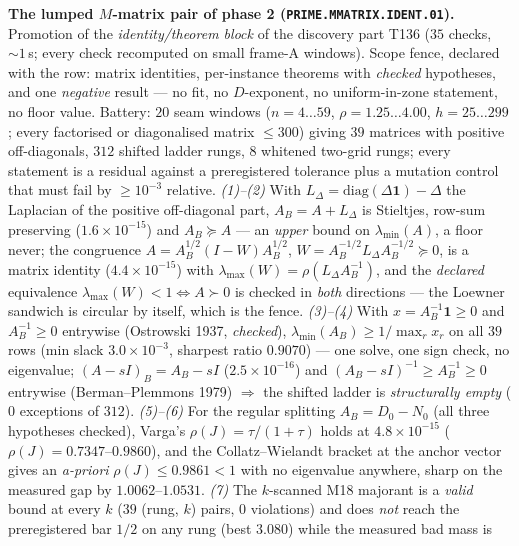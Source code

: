 \par\smallskip\noindent\textbf{The lumped $M$-matrix pair of phase 2
(\texttt{PRIME.MMATRIX.IDENT.01}).}
Promotion of the \emph{identity/theorem block} of the discovery part T136
($35$ checks, ${\sim}1$\,s; every check recomputed on small frame-A windows).
Scope fence, declared with the row: matrix identities, per-instance theorems with
\emph{checked} hypotheses, and one \emph{negative} result --- no fit, no
$D$-exponent, no uniform-in-zone statement, no floor value. Battery: $20$ seam
windows ($n=4\ldots59$, $\rho=1.25\ldots4.00$, $h=25\ldots299$; every factorised
or diagonalised matrix $\le300$) giving $39$ matrices with positive
off-diagonals, $312$ shifted ladder rungs, $8$ whitened two-grid rungs; every
statement is a residual against a preregistered tolerance plus a mutation control
that must fail by $\ge10^{-3}$ relative.
\emph{(1)--(2)} With $L_\Delta=\mathrm{diag}(\Delta\mathbf 1)-\Delta$ the
Laplacian of the positive off-diagonal part, $A_B=A+L_\Delta$ is Stieltjes,
row-sum preserving ($1.6\times10^{-15}$) and $A_B\succeq A$ --- an \emph{upper}
bound on $\lambda_{\min}(A)$, a floor never; the congruence
$A=A_B^{1/2}(I-W)A_B^{1/2}$, $W=A_B^{-1/2}L_\Delta A_B^{-1/2}\succeq0$, is a
matrix identity ($4.4\times10^{-15}$) with
$\lambda_{\max}(W)=\rho(L_\Delta A_B^{-1})$, and the \emph{declared}
equivalence $\lambda_{\max}(W)<1\iff A\succ0$ is checked in \emph{both}
directions --- the Loewner sandwich is circular by itself, which is the fence.
\emph{(3)--(4)} With $x=A_B^{-1}\mathbf 1\ge0$ and $A_B^{-1}\ge0$ entrywise
(Ostrowski 1937, \emph{checked}), $\lambda_{\min}(A_B)\ge1/\max_r x_r$ on all
$39$ rows (min slack $3.0\times10^{-3}$, sharpest ratio $0.9070$) --- one solve,
one sign check, no eigenvalue; $(A-sI)_B=A_B-sI$ ($2.5\times10^{-16}$) and
$(A_B-sI)^{-1}\ge A_B^{-1}\ge0$ entrywise (Berman--Plemmons 1979) $\Rightarrow$
the shifted ladder is \emph{structurally empty} ($0$ exceptions of $312$).
\emph{(5)--(6)} For the regular splitting $A_B=D_0-N_0$ (all three hypotheses
checked), Varga's $\rho(J)=\tau/(1+\tau)$ holds at $4.8\times10^{-15}$
($\rho(J)=0.7347$--$0.9860$), and the Collatz--Wielandt bracket at the anchor
vector gives an \emph{a-priori} $\rho(J)\le0.9861<1$ with no eigenvalue
anywhere, sharp on the measured gap by $1.0062$--$1.0531$.
\emph{(7)} The $k$-scanned M18 majorant is a \emph{valid} bound at every $k$
($39$ (rung, $k$) pairs, $0$ violations) and does \emph{not} reach the
preregistered bar $1/2$ on any rung (best $3.080$) while the measured bad mass is
